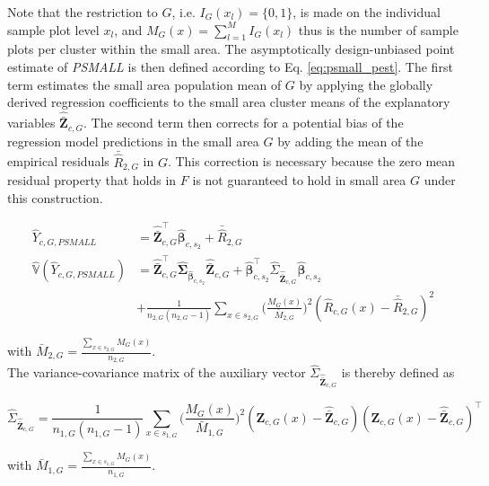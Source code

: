 \documentclass[remotesensing,article,submit,moreauthors,pdftex,10pt,a4paper]{mdpi}
\newcommand{\var}{\mathbb{V}}
\begin{document}
Note that the restriction to $G$, i.e. $I_{G}(x_l)=\{0,1\}$, is made on the individual sample plot level $x_l$, and $M_{G}(x) = \sum_{l=1}^{M}I_{G}(x_l)$ thus is the number of sample plots per cluster within the small area. The asymptotically design-unbiased point estimate of \textit{PSMALL} is then defined according to Eq. \ref{eq:psmall_pest}. The first term estimates the small area population mean of $G$ by applying the globally derived regression coefficients to the small area cluster means of the explanatory variables $\hat{\bar{\pmb{Z}}}_{c,G}$. The second term then corrects for a potential bias of the regression model predictions in the small area $G$ by adding the mean of the empirical residuals $\bar{\hat{R}}_{2,G}$ in $G$. This correction is necessary because the zero mean residual property that holds in $F$ is not guaranteed to hold in small area $G$ under this construction.

\begin{subequations}\label{eq:psmall}
	\begin{align}
	\hat{Y}_{c,G,PSMALL} &= \hat{\bar{\pmb{Z}}}_{c,G}^{\top}\hat{\pmb{\beta}}_{c,s_2} + \bar{\hat{R}}_{2,G} \label{eq:psmall_pest} \\
	\hat{\var}(\hat{Y}_{c,G,PSMALL}) & = \hat{\bar{\pmb{Z}}}_{c,G}^{\top}\hat{\pmb{\Sigma}}_{\hat{\pmb{\beta}}_{c,s_2}}\hat{\bar{\pmb{Z}}}_{c,G}
	+ \hat{\pmb{\beta}}_{c,s_2}^{\top}\hat{\Sigma}_{\hat{\bar{\pmb{Z}}}_{c,G}}\hat{\pmb{\beta}}_{c,s_2} \nonumber \\
	& + \frac{1}{n_{2,G}(n_{2,G}-1)}\sum_{x \in s_{2,G}}\Big(\frac{M_{G}(x)}{\bar{M}_{2,G}}\Big)^2(\hat{R}_{c,G}(x) - \bar{\hat{R}}_{2,G})^2
	\label{eq:psmallvar}
	\end{align}
\end{subequations}

\noindent with $\bar{M}_{2,G}=\frac{\sum_{x \in s_{2,G}}M_{G}(x)}{n_{2,G}}$.\\

The variance-covariance matrix of the auxiliary vector $\hat{\Sigma}_{\hat{\bar{\pmb{Z}}}_{c,G}}$ is thereby defined as

\begin{equation}\label{estvarcovaux_G}
\hat{\Sigma}_{\hat{\bar{\pmb{Z}}}_{c,G}} = \frac{1}{n_{1,G}(n_{1,G}-1)} \sum_{x \in s_{1,G}} \big(\frac{M_{G}(x)}{\bar{M}_{1,G}}\big)^2 (\pmb{Z}_{c,G}(x)-\hat{\bar{\pmb{Z}}}_{c,G})(\pmb{Z}_{c,G}(x)-\hat{\bar{\pmb{Z}}}_{c,G})^{\top}
\end{equation}

\noindent with $\bar{M}_{1,G}=\frac{\sum_{x \in s_{1,G}}M_{G}(x)}{n_{1,G}}$.\\
\end{document}
